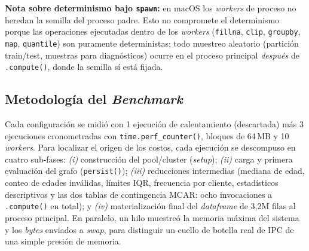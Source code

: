 \documentclass[12pt,letterpaper]{article}
\begin{document}
\noindent\textbf{Nota sobre determinismo bajo \texttt{spawn}:} en macOS los \textit{workers} de proceso
no heredan la semilla del proceso padre. Esto no compromete el determinismo porque las operaciones
ejecutadas dentro de los \textit{workers} (\texttt{fillna}, \texttt{clip}, \texttt{groupby},
\texttt{map}, \texttt{quantile}) son puramente deterministas; todo muestreo aleatorio (partición
train/test, muestras para diagnósticos) ocurre en el proceso principal \textit{después} de
\texttt{.compute()}, donde la semilla sí está fijada.

\subsection{Metodología del \textit{Benchmark}}
Cada configuración se midió con 1 ejecución de calentamiento (descartada) más 3 ejecuciones
cronometradas con \texttt{time.perf\_counter()}, bloques de 64\,MB y 10 \textit{workers}. Para
localizar el origen de los costos, cada ejecución se descompuso en cuatro sub-fases:
\textit{(i)} construcción del pool/cluster (\textit{setup}); \textit{(ii)} carga y primera
evaluación del grafo (\texttt{persist()}); \textit{(iii)} reducciones intermedias (mediana de edad,
conteo de edades inválidas, límites IQR, frecuencia por cliente, estadísticos descriptivos y las dos
tablas de contingencia MCAR: ocho invocaciones a \texttt{.compute()} en total); y \textit{(iv)}
materialización final del \textit{dataframe} de 3,2M filas al proceso principal. En paralelo, un hilo
muestreó la memoria máxima del sistema y los \textit{bytes} enviados a \textit{swap}, para distinguir
un cuello de botella real de IPC de una simple presión de memoria.
\end{document}
